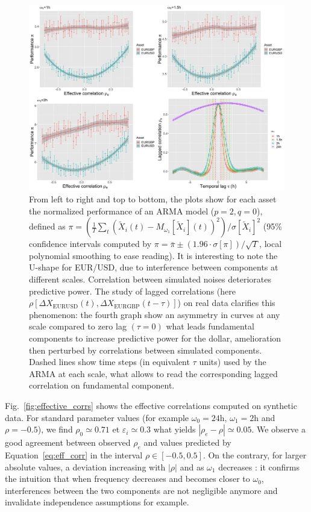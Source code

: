 \documentclass{bmcart}
\begin{document}
\begin{figure}[h!]
\includegraphics[width=\linewidth]{figures/Fig5.png}
\caption{ From left to right and top to bottom, the plots show for each asset the normalized performance of an ARMA model ($p=2,q=0$), defined as $\pi = \left(\frac{1}{T}\sum_t\left(\tilde{X}_i(t) - M_{\omega_1}\left[\tilde{X}_i\right](t)\right)^2 \right) / \sigma \left[ \tilde{X}_i \right]^2$ (95\% confidence intervals computed by $\pi = \bar{\pi} \pm (1.96\cdot \sigma [\pi])/\sqrt{T}$, local polynomial smoothing to ease reading). It is interesting to note the U-shape for EUR/USD, due to interference between components at different scales. Correlation between simulated noises deteriorates predictive power. The study of lagged correlations (here $\rho [\Delta X_{\textrm{EURUSD}}(t),\Delta X_{\textrm{EURGBP}}(t-\tau)]$) on real data clarifies this phenomenon: the fourth graph show an asymmetry in curves at any scale compared to zero lag $(\tau = 0)$ what leads fundamental components to increase predictive power for the dollar, amelioration then perturbed by correlations between simulated components. Dashed lines show time steps (in equivalent $\tau$ units) used by the ARMA at each scale, what allows to read the corresponding lagged correlation on fundamental component.\label{fig:model_perf}}
\end{figure}




Fig.~\ref{fig:effective_corrs} shows the effective correlations computed on synthetic data. For standard parameter values (for example $\omega_0=24\textrm{h}$, $\omega_1=2\textrm{h}$ and $\rho=-0.5$), we find $\rho_0\simeq 0.71$ et $\varepsilon_i \simeq 0.3$ what yields $\left| \rho_e - \rho \right|\simeq 0.05$. We observe a good agreement between observed $\rho_e$ and values predicted by Equation~\ref{eq:eff_corr} in the interval $\rho \in [-0.5,0.5]$. On the contrary, for larger absolute values, a deviation increasing with $\left|\rho\right|$ and as $\omega_1$ decreases : it confirms the intuition that when frequency decreases and becomes closer to $\omega_0$, interferences between the two components are not negligible anymore and invalidate independence assumptions for example.
\end{document}
